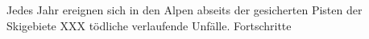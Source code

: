 Jedes Jahr ereignen sich in den Alpen abseits der gesicherten Pisten der Skigebiete XXX tödliche verlaufende Unfälle. Fortschritte 